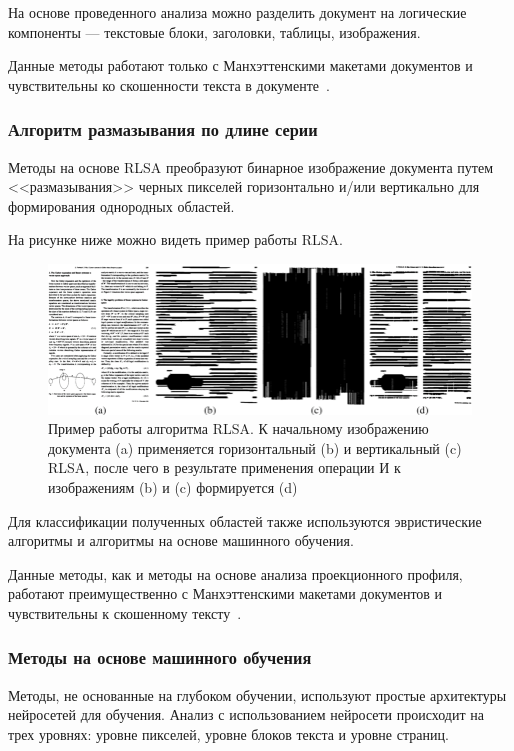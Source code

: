 На основе проведенного анализа можно разделить документ на логические компоненты --- текстовые блоки, заголовки, таблицы, изображения.

Данные методы работают только с Манхэттенскими макетами документов и чувствительны ко скошенности текста в документе~\cite{dla-book}.

\newpage

\subsubsection{Алгоритм размазывания по длине серии}

Методы на основе RLSA преобразуют бинарное изображение документа путем <<размазывания>> черных пикселей горизонтально и/или вертикально для формирования однородных областей.

На рисунке ниже можно видеть пример работы RLSA.

\begin{figure}[H]
	\centering
	\includegraphics[width=\textwidth]{img/rlsa.png}
    \caption{Пример работы алгоритма RLSA. К начальному изображению документа (a) применяется горизонтальный (b) и вертикальный (c) RLSA, после чего в результате применения операции И к изображениям (b) и (c) формируется (d)}
	\label{fig:}
\end{figure}

Для классификации полученных областей также используются эвристические алгоритмы и алгоритмы на основе машинного обучения.

Данные методы, как и методы на основе анализа проекционного профиля, работают преимущественно с Манхэттенскими макетами документов и чувствительны к скошенному тексту~\cite{dla-book}.

\subsubsection{Методы на основе машинного обучения}

Методы, не основанные на глубоком обучении, используют простые архитектуры нейросетей для обучения.
Анализ с использованием нейросети происходит на трех уровнях: уровне пикселей, уровне блоков текста и уровне страниц.

